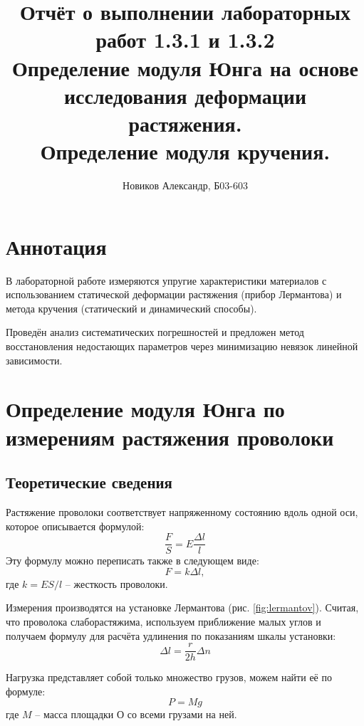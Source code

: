 \documentclass[a4paper, 12pt]{article}
\numberwithin{equation}{section}
\begin{document}
\title{Отчёт о выполнении лабораторных работ 1.3.1 и 1.3.2 \\
Определение модуля Юнга на основе исследования деформации растяжения. \\
Определение модуля кручения.}
\author{Новиков Александр, Б03-603}
\maketitle

\section{Аннотация}
В лабораторной работе измеряются упругие характеристики материалов
с использованием статической деформации растяжения (прибор Лермантова)
и метода кручения (статический и динамический способы).

Проведён анализ систематических погрешностей
и предложен метод восстановления недостающих параметров
через минимизацию невязок линейной зависимости.


\section{Определение модуля Юнга по измерениям растяжения проволоки}
\subsection{Теоретические сведения}
Растяжение проволоки соответствует напряженному состоянию вдоль одной оси,
которое описывается формулой:
\begin{equation}
    \frac{F}{S} = E \frac{\Delta l}{l}
    \label{stretch:general_hook}
\end{equation}
Эту формулу можно переписать также в следующем виде:
\begin{equation}
    F = k\Delta l,
	\label{stretch:hook}
\end{equation}
где $k = ES / l$ -- жесткость проволоки.

Измерения производятся на установке Лермантова (рис. \ref{fig:lermantov}).
Считая, что проволока слаборастяжима, используем приближение малых углов
и получаем формулу для расчёта удлинения по показаниям шкалы установки:
\begin{equation}
	\Delta l = \frac{r}{2h} \Delta n
	\label{stretch:length}
\end{equation}

Нагрузка представляет собой только множество грузов,
можем найти её по формуле:
\begin{equation}
	P = Mg
\end{equation}
где $M$ -- масса площадки О со всеми грузами на ней.
\end{document}
